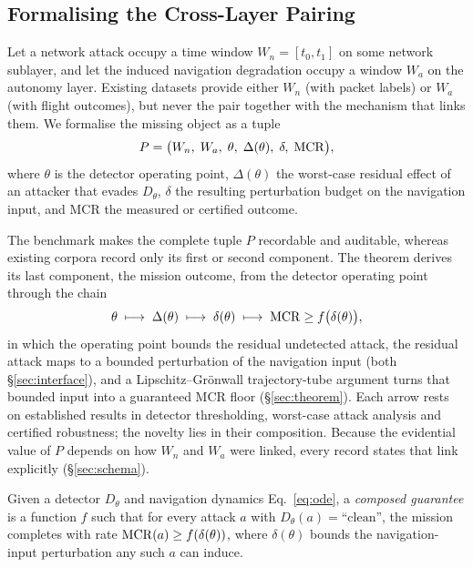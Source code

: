 \subsection{Formalising the Cross-Layer Pairing}
\label{sec:formulation}
Let a network attack occupy a time window $W_n=[t_0,t_1]$ on some network
sublayer, and let the induced navigation degradation occupy a window $W_a$ on
the autonomy layer. Existing datasets provide either $W_n$ (with packet labels)
or $W_a$ (with flight outcomes), but never the pair together with the mechanism
that links them. We formalise the missing object as a tuple
\begin{equation}
\label{eq:pairing}
P = \big(W_n,\; W_a,\; \theta,\; \Delta(\theta),\; \delta,\; \mathrm{MCR}\big),
\end{equation}
where $\theta$ is the detector operating point, $\Delta(\theta)$ the worst-case
residual effect of an attacker that evades $D_\theta$, $\delta$ the resulting
perturbation budget on the navigation input, and MCR the measured or certified
outcome.

The benchmark makes the complete tuple $P$ recordable and auditable, whereas
existing corpora record only its first or second component. The theorem derives
its last component, the mission outcome, from the detector operating point
through the chain
\begin{equation}
\label{eq:chain}
\theta \;\longmapsto\; \Delta(\theta) \;\longmapsto\; \delta(\theta)
\;\longmapsto\; \mathrm{MCR} \ge f\big(\delta(\theta)\big),
\end{equation}
in which the operating point bounds the residual undetected attack, the
residual attack maps to a bounded perturbation of the navigation input (both
\S\ref{sec:interface}), and a Lipschitz--Gr\"onwall trajectory-tube argument
turns that bounded input into a guaranteed MCR floor (\S\ref{sec:theorem}). Each
arrow rests on established results in detector thresholding, worst-case attack
analysis and certified robustness; the novelty lies in their composition.
Because the evidential value of $P$ depends on how $W_n$ and $W_a$ were linked,
every record states that link explicitly (\S\ref{sec:schema}).

\begin{definition}
\label{def:composed}
Given a detector $D_\theta$ and navigation dynamics Eq.~\eqref{eq:ode}, a
\emph{composed guarantee} is a function $f$ such that for every attack $a$ with
$D_\theta(a)=\text{``clean''}$, the mission completes with rate
$\mathrm{MCR}(a)\ge f(\delta(\theta))$, where $\delta(\theta)$ bounds the
navigation-input perturbation any such $a$ can induce.
\end{definition}

